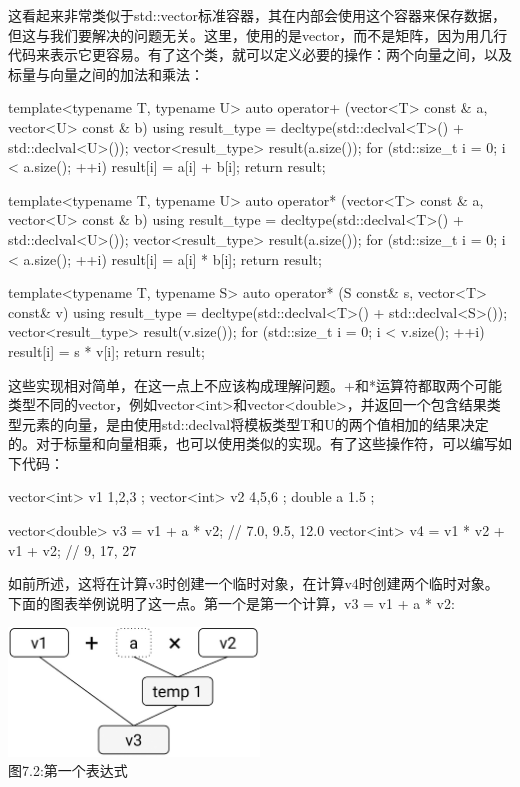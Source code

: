 这看起来非常类似于std::vector标准容器，其在内部会使用这个容器来保存数据，但这与我们要解决的问题无关。这里，使用的是vector，而不是矩阵，因为用几行代码来表示它更容易。有了这个类，就可以定义必要的操作：两个向量之间，以及标量与向量之间的加法和乘法：

\begin{cppcode}
template<typename T, typename U>
auto operator+ (vector<T> const & a, vector<U> const & b)
{
	using result_type = decltype(std::declval<T>() +
	std::declval<U>());
	vector<result_type> result(a.size());
	for (std::size_t i = 0; i < a.size(); ++i)
	{
		result[i] = a[i] + b[i];
	}
	return result;
}

template<typename T, typename U>
auto operator* (vector<T> const & a, vector<U> const & b)
{
	using result_type = decltype(std::declval<T>() +
	std::declval<U>());
	vector<result_type> result(a.size());
	for (std::size_t i = 0; i < a.size(); ++i)
	{
		result[i] = a[i] * b[i];
	}
	return result;
}

template<typename T, typename S>
auto operator* (S const& s, vector<T> const& v)
{
	using result_type = decltype(std::declval<T>() +
	std::declval<S>());
	vector<result_type> result(v.size());
	for (std::size_t i = 0; i < v.size(); ++i)
	{
		result[i] = s * v[i];
	}
	return result;
}
\end{cppcode}

这些实现相对简单，在这一点上不应该构成理解问题。+和*运算符都取两个可能类型不同的vector，例如vector<int>和vector<double>，并返回一个包含结果类型元素的向量，是由使用std::declval将模板类型T和U的两个值相加的结果决定的。对于标量和向量相乘，也可以使用类似的实现。有了这些操作符，可以编写如下代码：

\begin{cppcode}
vector<int> v1{ 1,2,3 };
vector<int> v2{ 4,5,6 };
double a{ 1.5 };

vector<double> v3 = v1 + a * v2; // {7.0, 9.5, 12.0}
vector<int> v4 = v1 * v2 + v1 + v2; // {9, 17, 27}
\end{cppcode}

如前所述，这将在计算v3时创建一个临时对象，在计算v4时创建两个临时对象。下面的图表举例说明了这一点。第一个是第一个计算，v3 = v1 + a * v2:

\begin{center}
\includegraphics[width=0.5\textwidth]{images/2.png}\\
图7.2:第一个表达式
\end{center}

